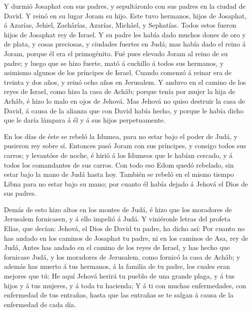  Y durmió Josaphat con sus padres, y sepultáronlo con sus
padres en la ciudad de David. Y reinó en su lugar Joram su hijo.
 Este tuvo hermanos, hijos de Josaphat, á Azarías, Jehiel,
Zachârías, Azarías, Michâel, y Sephatías. Todos estos fueron hijos de
Josaphat rey de Israel.  Y su padre les había dado muchos
dones de oro y de plata, y cosas preciosas, y ciudades fuertes en Judá;
mas había dado el reino á Joram, porque él era el primogénito.
 Fué pues elevado Joram al reino de su padre; y luego que se
hizo fuerte, mató á cuchillo á todos sus hermanos, y asimismo algunos de
los príncipes de Israel.  Cuando comenzó á reinar era de
treinta y dos años, y reinó ocho años en Jerusalem.  Y
anduvo en el camino de los reyes de Israel, como hizo la casa de Achâb;
porque tenía por mujer la hija de Achâb, é hizo lo malo en ojos de
Jehová.  Mas Jehová no quiso destruir la casa de David, á
causa de la alianza que con David había hecho, y porque le había dicho
que le daría lámpara á él y á sus hijos perpetuamente.

 En los días de éste se rebeló la Idumea, para no estar bajo
el poder de Judá, y pusieron rey sobre sí.  Entonces pasó
Joram con sus príncipes, y consigo todos sus carros; y levantóse de
noche, é hirió á los Idumeos que le habían cercado, y á todos los
comandantes de sus carros.  Con todo eso Edom quedó
rebelado, sin estar bajo la mano de Judá hasta hoy. También se rebeló en
el mismo tiempo Libna para no estar bajo su mano; por cuanto él había
dejado á Jehová el Dios de sus padres.

 Demás de esto hizo altos en los montes de Judá, é hizo que
los moradores de Jerusalem fornicasen, y á ello impelió á Judá.
 Y viniéronle letras del profeta Elías, que decían: Jehová,
el Dios de David tu padre, ha dicho así: Por cuanto no has andado en los
caminos de Josaphat tu padre, ni en los caminos de Asa, rey de Judá,
 Antes has andado en el camino de los reyes de Israel, y
has hecho que fornicase Judá, y los moradores de Jerusalem, como fornicó
la casa de Achâb; y además has muerto á tus hermanos, á la familia de tu
padre, los cuales eran mejores que tú:  He aquí Jehová
herirá tu pueblo de una grande plaga, y á tus hijos y á tus mujeres, y á
toda tu hacienda;  Y á ti con muchas enfermedades, con
enfermedad de tus entrañas, hasta que las entrañas se te salgan á causa
de la enfermedad de cada día.

